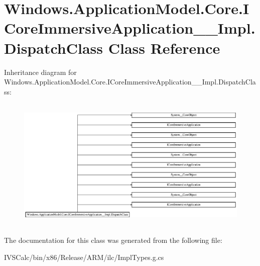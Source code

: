 \hypertarget{class_windows_1_1_application_model_1_1_core_1_1_i_core_immersive_application_____impl_1_1_dispatch_class}{}\section{Windows.\+Application\+Model.\+Core.\+I\+Core\+Immersive\+Application\+\_\+\+\_\+\+Impl.\+Dispatch\+Class Class Reference}
\label{class_windows_1_1_application_model_1_1_core_1_1_i_core_immersive_application_____impl_1_1_dispatch_class}
Inheritance diagram for Windows.\+Application\+Model.\+Core.\+I\+Core\+Immersive\+Application\+\_\+\+\_\+\+Impl.\+Dispatch\+Class\+:\begin{figure}[H]
\begin{center}
\leavevmode
\includegraphics[height=6.443515cm]{class_windows_1_1_application_model_1_1_core_1_1_i_core_immersive_application_____impl_1_1_dispatch_class}
\end{center}
\end{figure}


The documentation for this class was generated from the following file\+:\begin{DoxyCompactItemize}
\item 
I\+V\+S\+Calc/bin/x86/\+Release/\+A\+R\+M/ilc/Impl\+Types.\+g.\+cs\end{DoxyCompactItemize}
